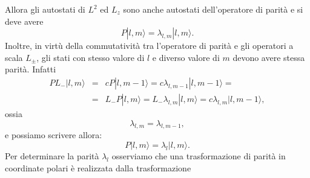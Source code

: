 \documentclass[a4paper,12pt,oneside]{book}
\begin{document}
Allora gli autostati di $L^2$ ed $L_z$ sono anche autostati dell'operatore di parità e si deve avere
\begin{equation}
P|l,m\rangle=\lambda_{l,m}|l,m\rangle.
\end{equation}
Inoltre, in virtù della commutatività tra l'operatore di parità e gli operatori a scala $L_{\pm}$, gli stati con stesso valore di $l$ e diverso valore di $m$ devono avere stessa parità. Infatti
\begin{eqnarray} 
 PL_-|l,m\rangle &= & cP|l,m-1\rangle=c\lambda_{l,m-1}|l,m-1\rangle=  \nonumber \\
&= & L_-P|l,m\rangle=L_- \lambda_{l,m}|l,m\rangle=c\lambda_{l,m}|l,m-1\rangle ,
\end{eqnarray}
ossia
\begin{equation} 
\lambda_{l,m}=\lambda_{l,m-1},
\end{equation}
e possiamo scrivere allora:
\begin{equation} 
P|l,m\rangle=\lambda_l|l,m \rangle.
\end{equation}
Per determinare la parità $\lambda_l$ osserviamo che una trasformazione di parità in coordinate polari è realizzata dalla trasformazione 
\end{document}
